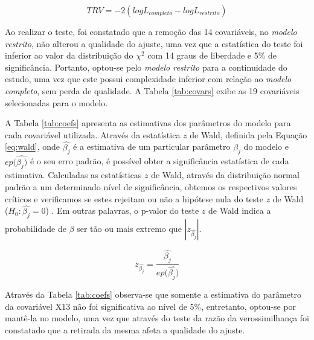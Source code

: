 \documentclass[twocolumn]{rbef}
\newcommand{\1}{\mathbbm{1}}
\begin{document}
\begin{equation}
TRV = -2(logL_{completo} - logL_{restrito})\label{eq:trv}
\end{equation}

Ao realizar o teste, foi constatado que a remoção das 14 covariáveis, no \textit{modelo restrito}, não alterou a qualidade do ajuste, uma vez que a estatística do teste foi inferior ao valor da distribuição do \({\chi}^2\) com 14 graus de liberdade e 5\% de significância. Portanto, optou-se pelo \textit{modelo restrito} para a continuidade do estudo, uma vez que este possui complexidade inferior com relação ao \textit{modelo completo}, sem perda de qualidade. A Tabela \ref{tab:covars} exibe as 19 covariáveis selecionadas para o modelo.

A Tabela \ref{tab:coefs} apresenta as estimativas dos parâmetros do modelo para cada covariável utilizada. Através da estatística \(z\) de Wald, definida pela Equação \eqref{eq:wald}, onde \(\hat{\beta_j}\) é a estimativa de um particular parâmetro \(\beta_j\) do modelo e \(ep(\hat{\beta_j)}\) é o seu erro padrão, é possível obter a significância estatística de cada estimativa. Calculadas as estatísticas \(z\) de Wald, através da distribuição normal padrão a um determinado nível de significância, obtemos os respectivos valores críticos e verificamos se estes rejeitam ou não a hipótese nula do teste \(z\) de Wald (\(H_0:\hat{\beta_j}=0\)) \cite{Favero2017}. Em outras palavras, o p-valor do teste \(z\) de Wald indica a probabilidade de \(\beta\) ser tão ou mais extremo que \(|z_{\hat{\beta_j}}|\).

\begin{equation}
z_{\hat{\beta_j}}=\dfrac{\hat{\beta_j}}{ep(\hat{\beta_j)}}\label{eq:wald}
\end{equation}

Através da Tabela \ref{tab:coefs} observa-se que somente a estimativa do parâmetro da covariável X13 não foi significativa ao nível de 5\%, entretanto, optou-se por mantê-la no modelo, uma vez que através do teste da razão da verossimilhança foi constatado que a retirada da mesma afeta a qualidade do ajuste.
\end{document}
